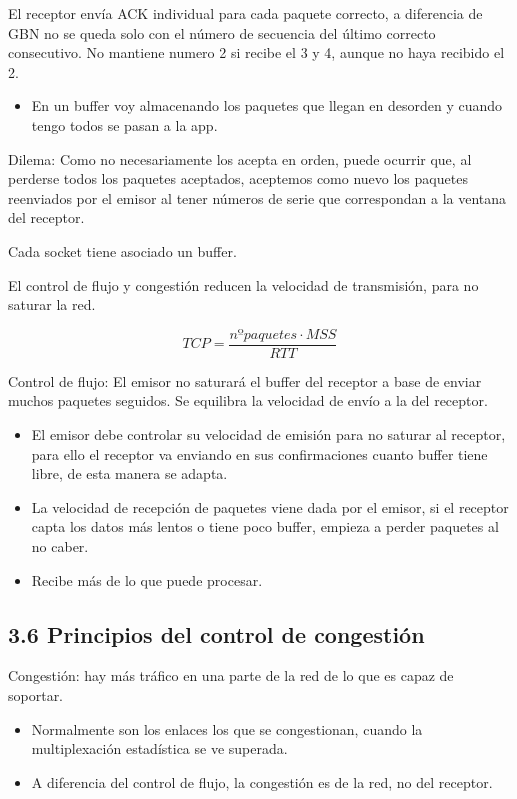 \documentclass[12pt, twoside, openright]{report} %
\begin{document}
El receptor envía ACK individual para cada paquete correcto, a
diferencia de GBN no se queda solo con el número de secuencia
del último correcto consecutivo. No mantiene numero 2 si recibe
el 3 y 4, aunque no haya recibido el 2.

\begin{itemize}
	\item En un buffer voy almacenando los paquetes que llegan en
	      desorden y cuando tengo todos se pasan a la app.
\end{itemize}

Dilema: Como no necesariamente los acepta en orden, puede
ocurrir que, al perderse todos los paquetes aceptados, aceptemos
como nuevo los paquetes reenviados por el emisor al tener
números de serie que correspondan a la ventana del receptor.


Cada socket tiene asociado un buffer.

El control de flujo y congestión reducen la velocidad de
transmisión, para no saturar la red.

$$TCP = \frac {nºpaquetes\cdot MSS}{RTT}$$

Control de flujo: El emisor no saturará el buffer del receptor a
base de enviar muchos paquetes seguidos. Se equilibra la velocidad
de envío a la del receptor.

\begin{itemize}
	\item El emisor debe controlar su velocidad de emisión para no saturar
	      al receptor, para ello el receptor va enviando en sus
	      confirmaciones cuanto buffer tiene libre, de esta manera se
	      adapta.
	\item La velocidad de recepción de paquetes viene dada por el emisor, si
	      el receptor capta los datos más lentos o tiene poco buffer, empieza
	      a perder paquetes al no caber.
	\item Recibe más de lo que puede procesar.
\end{itemize}

\pagebreak
\subsection{3.6 Principios del control de congestión}

Congestión: hay más tráfico en una parte de la red de lo que es
capaz de soportar.

\begin{itemize}
	\item Normalmente son los enlaces los que se congestionan, cuando la
	      multiplexación estadística se ve superada.
	\item A diferencia del control de flujo, la congestión es de la red, no
	      del receptor.
\end{itemize}
\end{document}
